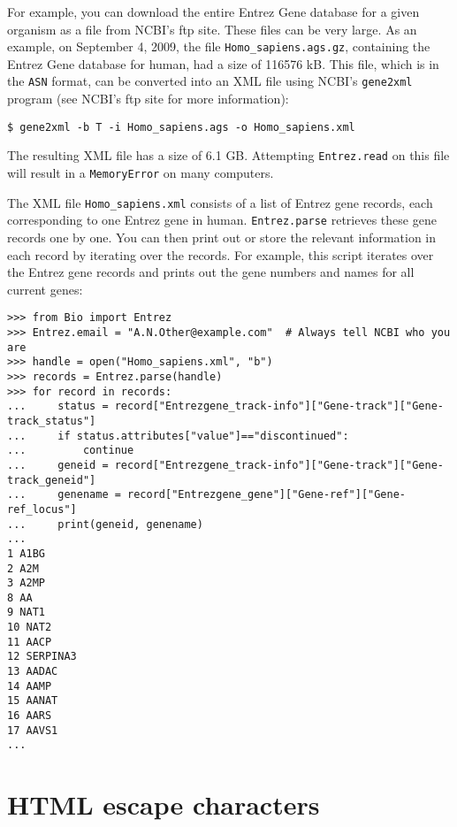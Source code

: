For example, you can download the entire Entrez Gene database for a given organism as a file from NCBI's ftp site. These files can be very large. As an example, on September 4, 2009, the file \verb+Homo_sapiens.ags.gz+, containing the Entrez Gene database for human, had a size of 116576 kB. This file, which is in the \verb+ASN+ format, can be converted into an XML file using NCBI's \verb+gene2xml+ program (see NCBI's ftp site for more information):

\begin{verbatim}
$ gene2xml -b T -i Homo_sapiens.ags -o Homo_sapiens.xml
\end{verbatim}

The resulting XML file has a size of 6.1 GB. Attempting \verb+Entrez.read+ on this file will result in a \verb+MemoryError+ on many computers.

The XML file \verb+Homo_sapiens.xml+ consists of a list of Entrez gene records, each corresponding to one Entrez gene in human. \verb+Entrez.parse+ retrieves these gene records one by one. You can then print out or store the relevant information in each record by iterating over the records. For example, this script iterates over the Entrez gene records and prints out the gene numbers and names for all current genes:

\begin{verbatim}
>>> from Bio import Entrez
>>> Entrez.email = "A.N.Other@example.com"  # Always tell NCBI who you are
>>> handle = open("Homo_sapiens.xml", "b")
>>> records = Entrez.parse(handle)
>>> for record in records:
...     status = record["Entrezgene_track-info"]["Gene-track"]["Gene-track_status"]
...     if status.attributes["value"]=="discontinued":
...         continue
...     geneid = record["Entrezgene_track-info"]["Gene-track"]["Gene-track_geneid"]
...     genename = record["Entrezgene_gene"]["Gene-ref"]["Gene-ref_locus"]
...     print(geneid, genename)
...
1 A1BG
2 A2M
3 A2MP
8 AA
9 NAT1
10 NAT2
11 AACP
12 SERPINA3
13 AADAC
14 AAMP
15 AANAT
16 AARS
17 AAVS1
...
\end{verbatim}

\section{HTML escape characters}

